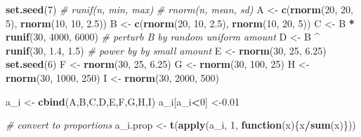 \documentclass[onecolumn]{book}
\newenvironment{Shaded}{\begin{snugshade}}{\end{snugshade}}
\newcommand{\CommentTok}[1]{\textcolor[rgb]{0.56,0.35,0.01}{\textit{#1}}}
\newcommand{\ControlFlowTok}[1]{\textcolor[rgb]{0.13,0.29,0.53}{\textbf{#1}}}
\newcommand{\DecValTok}[1]{\textcolor[rgb]{0.00,0.00,0.81}{#1}}
\newcommand{\FloatTok}[1]{\textcolor[rgb]{0.00,0.00,0.81}{#1}}
\newcommand{\KeywordTok}[1]{\textcolor[rgb]{0.13,0.29,0.53}{\textbf{#1}}}
\newcommand{\NormalTok}[1]{#1}
\newcommand{\OperatorTok}[1]{\textcolor[rgb]{0.81,0.36,0.00}{\textbf{#1}}}
\newcommand{\StringTok}[1]{\textcolor[rgb]{0.31,0.60,0.02}{#1}}
\theoremstyle{definition}
\theoremstyle{definition}
\theoremstyle{definition}
\theoremstyle{remark}
\begin{document}
\begin{Shaded}
\begin{Highlighting}[]
\KeywordTok{set.seed}\NormalTok{(}\DecValTok{7}\NormalTok{)}
\CommentTok{# runif(n, min, max)}
\CommentTok{# rnorm(n, mean, sd)}
\NormalTok{A <-}\StringTok{ }\KeywordTok{c}\NormalTok{(}\KeywordTok{rnorm}\NormalTok{(}\DecValTok{20}\NormalTok{, }\DecValTok{20}\NormalTok{, }\DecValTok{5}\NormalTok{), }\KeywordTok{rnorm}\NormalTok{(}\DecValTok{10}\NormalTok{, }\DecValTok{10}\NormalTok{, }\FloatTok{2.5}\NormalTok{))}
\NormalTok{B <-}\StringTok{ }\KeywordTok{c}\NormalTok{(}\KeywordTok{rnorm}\NormalTok{(}\DecValTok{20}\NormalTok{, }\DecValTok{10}\NormalTok{, }\FloatTok{2.5}\NormalTok{), }\KeywordTok{rnorm}\NormalTok{(}\DecValTok{10}\NormalTok{, }\DecValTok{20}\NormalTok{, }\DecValTok{5}\NormalTok{))}
\NormalTok{C <-}\StringTok{ }\NormalTok{B }\OperatorTok{*}\StringTok{ }\KeywordTok{runif}\NormalTok{(}\DecValTok{30}\NormalTok{, }\DecValTok{4000}\NormalTok{, }\DecValTok{6000}\NormalTok{) }\CommentTok{# perturb B by random uniform amount}
\NormalTok{D <-}\StringTok{ }\NormalTok{B }\OperatorTok{^}\StringTok{ }\KeywordTok{runif}\NormalTok{(}\DecValTok{30}\NormalTok{, }\FloatTok{1.4}\NormalTok{, }\FloatTok{1.5}\NormalTok{) }\CommentTok{# power by by small amount}
\NormalTok{E <-}\StringTok{ }\KeywordTok{rnorm}\NormalTok{(}\DecValTok{30}\NormalTok{, }\DecValTok{25}\NormalTok{, }\FloatTok{6.25}\NormalTok{)}
\KeywordTok{set.seed}\NormalTok{(}\DecValTok{6}\NormalTok{)}
\NormalTok{F <-}\StringTok{ }\KeywordTok{rnorm}\NormalTok{(}\DecValTok{30}\NormalTok{, }\DecValTok{25}\NormalTok{, }\FloatTok{6.25}\NormalTok{)}
\NormalTok{G <-}\StringTok{ }\KeywordTok{rnorm}\NormalTok{(}\DecValTok{30}\NormalTok{, }\DecValTok{100}\NormalTok{, }\DecValTok{25}\NormalTok{)}
\NormalTok{H <-}\StringTok{ }\KeywordTok{rnorm}\NormalTok{(}\DecValTok{30}\NormalTok{, }\DecValTok{1000}\NormalTok{, }\DecValTok{250}\NormalTok{)}
\NormalTok{I <-}\StringTok{ }\KeywordTok{rnorm}\NormalTok{(}\DecValTok{30}\NormalTok{, }\DecValTok{2000}\NormalTok{, }\DecValTok{500}\NormalTok{)}

\NormalTok{a_i <-}\StringTok{ }\KeywordTok{cbind}\NormalTok{(A,B,C,D,E,F,G,H,I)}
\NormalTok{a_i[a_i}\OperatorTok{<}\DecValTok{0}\NormalTok{] <-}\FloatTok{0.01}

\CommentTok{# convert to proportions}
\NormalTok{a_i.prop <-}\StringTok{ }\KeywordTok{t}\NormalTok{(}\KeywordTok{apply}\NormalTok{(a_i, }\DecValTok{1}\NormalTok{, }\ControlFlowTok{function}\NormalTok{(x)\{x}\OperatorTok{/}\KeywordTok{sum}\NormalTok{(x)\}))}


\end{Highlighting}
\end{Shaded}
\end{document}
